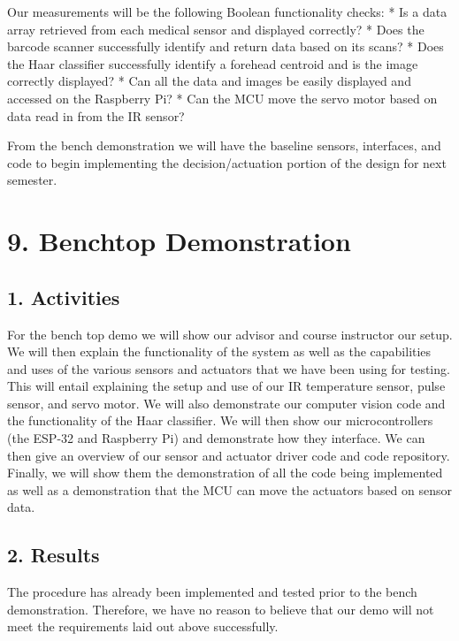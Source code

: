 ﻿\documentclass[10pt]{article}
\begin{document}
Our measurements will be the following Boolean functionality checks:
   * Is a data array retrieved from each medical sensor and displayed correctly?
   * Does the barcode scanner successfully identify and return data based on its scans?
   * Does the Haar classifier successfully identify a forehead centroid and is the image correctly displayed?
   * Can all the data and images be easily displayed and accessed on the Raspberry Pi?
   * Can the MCU move the servo motor  based on data read in from the IR sensor?

From the bench demonstration we will have the baseline sensors, interfaces, and code to begin implementing the decision/actuation portion of the design for next semester. 

\section{9. Benchtop Demonstration}
\subsection{1. Activities}
        For the bench top demo we will show our advisor and course instructor our setup. We will then explain the functionality of the system as well as the capabilities and uses of the various sensors and actuators that we have been using for testing. This will entail explaining the setup and use of our IR temperature sensor, pulse sensor, and servo motor. We will also demonstrate our computer vision code and the functionality of the Haar classifier. We will then show our microcontrollers (the ESP-32 and Raspberry Pi) and demonstrate how they interface. We can then give  an overview of our sensor and actuator driver code and code repository. Finally, we will show them the demonstration of all the code being implemented as well as a demonstration that the MCU can move the actuators based on sensor data.

\subsection{2. Results }
        The procedure has already been implemented and tested prior to the bench demonstration. Therefore, we have no reason to believe that our demo will not meet the requirements laid out above successfully.
        
\end{document}
